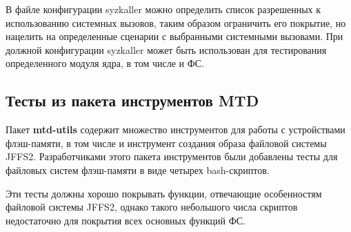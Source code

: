 В файле конфигурации syzkaller можно определить список разрешенных к использованию системных вызовов, таким образом ограничить его покрытие, но нацелить на определенные сценарии с выбранными системными вызовами. При должной конфигурации syzkaller может быть использован для тестирования определенного модуля ядра, в том числе и ФС. 

\subsection{Тесты из пакета инструментов MTD}

Пакет \textbf{mtd-utils} \cite{mtd-utils} содержит множество инструментов для работы с устройствами флэш-памяти, в том числе и инструмент создания образа файловой системы JFFS2. Разработчиками этого пакета инструментов были добавлены тесты для файловых систем флэш-памяти в виде четырех bash-скриптов.

Эти тесты должны хорошо покрывать функции, отвечающие особенностям файловой системы JFFS2, однако такого небольшого числа скриптов недостаточно для покрытия всех основных функций ФС.

\newpage
